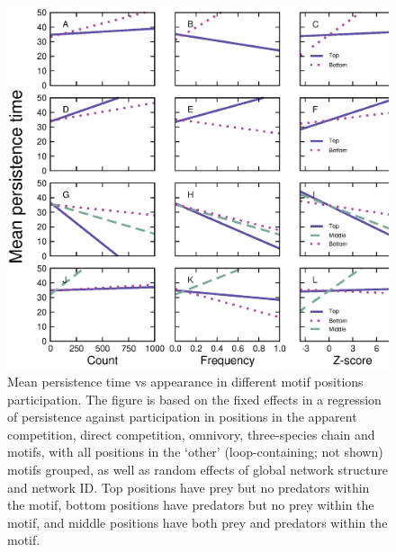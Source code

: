 \documentclass[12pt]{article}
\begin{document}
    \begin{figure}[ht!]
        \centering
        \includegraphics[width=\textwidth]{figures/roles/persistence_vs_positions.eps}
        \caption{Mean persistence time vs appearance in different motif positions participation. The figure is based on the fixed effects in a regression of persistence against participation in positions in the apparent competition, direct competition, omnivory, three-species chain and motifs, with all positions in the `other' (loop-containing; not shown) motifs grouped, as well as random effects of global network structure and network ID. Top positions have prey but no predators within the motif, bottom positions have predators but no prey within the motif, and middle positions have both prey and predators within the motif.}
        \label{fig:persistence_positions}
    \end{figure}



    \clearpage
\end{document}
